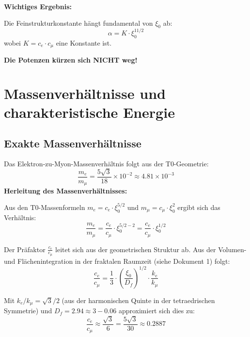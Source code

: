 \documentclass[12pt,a4paper]{article}
\newcommand{\xipar}{\xi_0}
\newcommand{\Dfrak}{D_f}
\begin{document}
	\begin{warning}
		\textbf{Wichtiges Ergebnis:}
		
		Die Feinstrukturkonstante hängt fundamental von $\xipar$ ab:
		\begin{equation}
			\boxed{\alpha = K \cdot \xipar^{11/2}}
		\end{equation}
		wobei $K = c_e \cdot c_\mu$ eine Konstante ist.
		
		\textbf{Die Potenzen kürzen sich NICHT weg!}
	\end{warning}
	
	\section{Massenverhältnisse und charakteristische Energie}
	
	\subsection{Exakte Massenverhältnisse}
	
	Das Elektron-zu-Myon-Massenverhältnis folgt aus der T0-Geometrie:
	\begin{equation}
		\frac{m_e}{m_\mu} = \frac{5\sqrt{3}}{18} \times 10^{-2} \approx 4.81 \times 10^{-3}
		\label{eq:mass_ratio}
	\end{equation}
	\textbf{Herleitung des Massenverhältnisses:}
	
	Aus den T0-Massenformeln $m_e = c_e \cdot \xipar^{5/2}$ und $m_\mu = c_\mu \cdot \xipar^2$ ergibt sich das Verhältnis:
	\begin{equation}
		\frac{m_e}{m_\mu} = \frac{c_e}{c_\mu} \cdot \xipar^{5/2 - 2} = \frac{c_e}{c_\mu} \cdot \xipar^{1/2}
		\label{eq:mass_ratio_derivation1}
	\end{equation}
	
	Der Präfaktor $\frac{c_e}{c_\mu}$ leitet sich aus der geometrischen Struktur ab. Aus der Volumen- und Flächenintegration in der fraktalen Raumzeit (siehe Dokument 1) folgt:
	\begin{equation}
		\frac{c_e}{c_\mu} = \frac{1}{3} \cdot \left( \frac{\xipar}{\Dfrak} \right)^{1/2} \cdot \frac{k_e}{k_\mu}
		\label{eq:ce_over_cmu}
	\end{equation}
	
	Mit $k_e / k_\mu = \sqrt{3}/2$ (aus der harmonischen Quinte in der tetraedrischen Symmetrie) und $\Dfrak = 2.94 \approx 3 - 0.06$ approximiert sich dies zu:
	\begin{equation}
		\frac{c_e}{c_\mu} \approx \frac{\sqrt{3}}{6} = \frac{5\sqrt{3}}{30} \approx 0.2887
		\label{eq:approx_ce_cmu}
	\end{equation}
	
\end{document}
